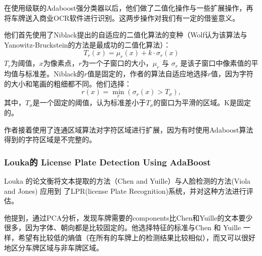 在使用级联的Adaboost强分类器以后，他们做了二值化操作与一些扩展操作，再将车牌送入商业OCR软件进行识别。这两步操作对我们有一定的借鉴意义。

他们首先使用了Niblack提出的自适应的二值化算法的变种（Wolf认为该算法与Yanowitz-Bruckstein的方法是最成功的二值化算法）：
$$T_r(x)=\mu_r(x)+k\cdot \sigma_r(x)$$
$T_r$为阈值，$x$为像素点，$r$为一个子窗口的大小，$\mu_r$ 与 $\sigma_r$ 是该子窗口中像素值的平均值与标准差。Niblack的$r$值是固定的，作者的算法自适应地选择$r$值，因为字符的大小和笔画的粗细都不同。他们选择：
$$r(x)=\min_r(\sigma_r(x)>T_\sigma),$$
其中，$T_\sigma$是一个固定的阈值，认为标准差小于$T_\sigma$的窗口为平滑的区域。K是固定的。

作者接着使用了连通区域算法对字符区域进行扩展，因为有时使用Adaboost算法得到的字符区域是不完整的。
\subsubsection{Louka的 License Plate Detection Using AdaBoost}
Louka 的论文衡将文本提取的方法（Chen and Yuille）与人脸检测的方法(Viola and Jones) 应用到 了LPR(license Plate Recognition)系统，并对这种方法进行评估。

他提到，通过PCA分析，发现车牌需要的components比Chen和Yuille的文本要少很多，因为字体、朝向都是比较固定的。他选择特征的标准与Chen 和 Yuille 一样，希望有比较低的熵值（在所有的车牌上的检测结果比较相似），而又可以很好地区分车牌区域与非车牌区域。

